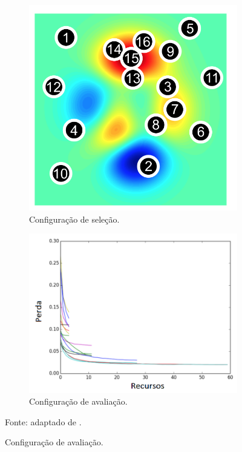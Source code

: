             \begin{figure}[htbp]
                \centering
                \caption{Algoritmo HyperBand.}
                \label{fig:hyperband}
                \begin{subfigure}{.5\textwidth}
                    \centering
                    \includegraphics[width=.7\linewidth]{imagens/configuration_selection.png}
                    \caption{Configuração de seleção.}
                    \label{fig:hyperband_configuration}
                \end{subfigure}%
                \begin{subfigure}{.5\textwidth}
                    \centering
                    \includegraphics[width=.95\linewidth]{imagens/configuration_evaluation.png}
                    \caption{Configuração de avaliação.}
                    \label{fig:hyperband_evaluation}
                \end{subfigure}
                \par \footnotesize Fonte: adaptado de \cite{li2018hyperband}.
            \end{figure}


